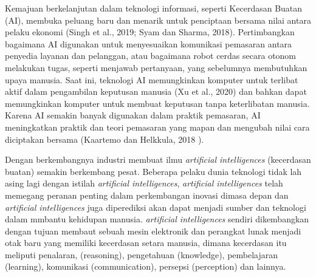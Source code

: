 Kemajuan berkelanjutan dalam teknologi informasi, seperti Kecerdasan Buatan (AI), membuka peluang baru dan menarik untuk penciptaan bersama nilai antara pelaku ekonomi (Singh et al., 2019; Syam dan Sharma, 2018). Pertimbangkan bagaimana AI digunakan untuk menyesuaikan komunikasi pemasaran antara penyedia layanan dan pelanggan, atau bagaimana robot cerdas secara otonom melakukan tugas, seperti menjawab pertanyaan, yang sebelumnya membutuhkan upaya manusia. Saat ini, teknologi AI memungkinkan komputer untuk terlibat aktif dalam pengambilan keputusan manusia (Xu et al., 2020) dan bahkan dapat memungkinkan komputer untuk membuat keputusan tanpa keterlibatan manusia. Karena AI semakin banyak digunakan dalam praktik pemasaran, AI meningkatkan praktik dan teori pemasaran yang mapan dan mengubah nilai cara diciptakan bersama (Kaartemo dan Helkkula, 2018 ).

Dengan berkembangnya industri membuat ilmu  \textit{artificial intelligences} (kecerdasan buatan) semakin berkembang pesat. Beberapa pelaku dunia teknologi tidak lah asing lagi dengan istilah \textit{artificial intelligences}, \textit{artificial intelligences} telah memegang peranan penting dalam perkembangan inovasi dimasa depan dan \textit{artificial intelligences} juga diperediksi akan dapat menjadi sumber dan teknologi dalam mmbantu kehidupan manusia. \textit{artificial intelligences} sendiri dikembangkan dengan tujuan membaut sebuah mesin elektronik dan perangkat lunak menjadi otak baru yang memiliki kecerdasan setara manusia, dimana kecerdasan itu meliputi penalaran, (reasoning), pengetahuan (knowledge), pembelajaran (learning), komunikasi (communication), persepsi (perception) dan lainnya. 

